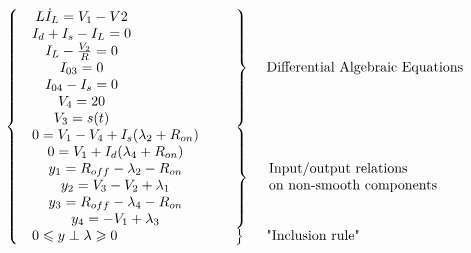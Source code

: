 \documentclass{article}
\def\geq{\geqslant}
\def\leq{\leqslant}
\begin{document}
\begin{equation}
  \label{eq:72}
 \left\{ \begin{array}{l l l}
    \begin{array}{c}
      L \dot I_L = V_1-V2\\
      I_d+I_s-I_L=0\\
      I_L-\frac{V_2}{R}=0\\
      I_{03}=0\\
      I_{04}-I_{s}=0\\
      V_4=20\\
      V_3=s(t)\\
\end{array}
& \left.\begin{array}{c}
      \\
      \\
      \\
      \\
      \\
      \\
      \\
\end{array}\right\}& \text{ Differential Algebraic Equations}\\[2mm]
  \begin{array}{c}
    0 = V_1-V_4+I_s(\lambda_2+R_{on}) \\
    0 = V_1+I_d(\lambda_4+R_{on}) \\
    y_1 = R_{off}-\lambda_2-R_{on}\\
    y_2 = V_3-V_2+\lambda_1\\
    y_3 = R_{off}-\lambda_4-R_{on}\\
    y_4 = -V_1+\lambda_3\\
  \end{array} & \left.\begin{array}{c}
     \\
     \\
    \\
    \\
    \\
    \\
  \end{array}\right\} & \begin{array}{l}
   \text{Input/output relations }\\
   \text{on non-smooth components}
  \end{array}  \\[5mm]
  \begin{array}{c}
  0 \leq y \perp \lambda \geq 0
\end{array} 
& \left.\begin{array}{c}\\ \end{array}\right\}  &  \text{ "Inclusion rule"}\\ 
\end{array}\right.
\end{equation}
\end{document}

